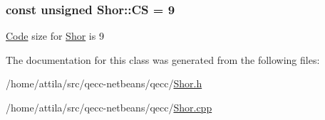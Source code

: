 \subsubsection[{\texorpdfstring{CS}{CS}}]{\setlength{\rightskip}{0pt plus 5cm}const unsigned Shor\+::\+CS = 9\hspace{0.3cm}{\ttfamily [static]}}\hypertarget{class_shor_a5c2bb5ad73004577f8781a001eda8b8f}{}\label{class_shor_a5c2bb5ad73004577f8781a001eda8b8f}
\hyperlink{class_code}{Code} size for \hyperlink{class_shor}{Shor} is 9 

The documentation for this class was generated from the following files\+:\begin{DoxyCompactItemize}
\item 
/home/attila/src/qecc-\/netbeans/qecc/\hyperlink{_shor_8h}{Shor.\+h}\item 
/home/attila/src/qecc-\/netbeans/qecc/\hyperlink{_shor_8cpp}{Shor.\+cpp}\end{DoxyCompactItemize}
